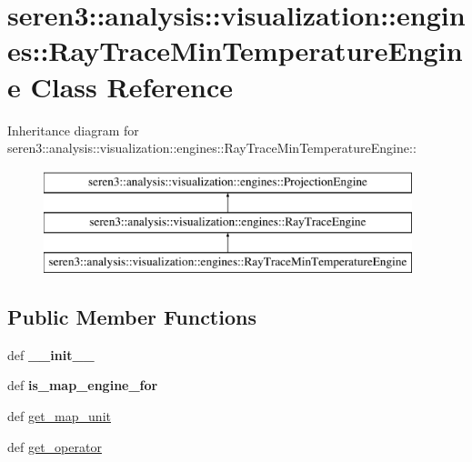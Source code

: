 \hypertarget{classseren3_1_1analysis_1_1visualization_1_1engines_1_1RayTraceMinTemperatureEngine}{
\section{seren3::analysis::visualization::engines::RayTraceMinTemperatureEngine Class Reference}
\label{classseren3_1_1analysis_1_1visualization_1_1engines_1_1RayTraceMinTemperatureEngine}
}
Inheritance diagram for seren3::analysis::visualization::engines::RayTraceMinTemperatureEngine::\begin{figure}[H]
\begin{center}
\leavevmode
\includegraphics[height=3cm]{classseren3_1_1analysis_1_1visualization_1_1engines_1_1RayTraceMinTemperatureEngine}
\end{center}
\end{figure}
\subsection*{Public Member Functions}
\begin{DoxyCompactItemize}
\item 
\hypertarget{classseren3_1_1analysis_1_1visualization_1_1engines_1_1RayTraceMinTemperatureEngine_ae3ad3045b6e11e034e7b1de487d62b72}{
def {\bfseries \_\-\_\-init\_\-\_\-}}
\label{classseren3_1_1analysis_1_1visualization_1_1engines_1_1RayTraceMinTemperatureEngine_ae3ad3045b6e11e034e7b1de487d62b72}

\item 
\hypertarget{classseren3_1_1analysis_1_1visualization_1_1engines_1_1RayTraceMinTemperatureEngine_a113275fa9fdb58977b93e260f0594454}{
def {\bfseries is\_\-map\_\-engine\_\-for}}
\label{classseren3_1_1analysis_1_1visualization_1_1engines_1_1RayTraceMinTemperatureEngine_a113275fa9fdb58977b93e260f0594454}

\item 
def \hyperlink{classseren3_1_1analysis_1_1visualization_1_1engines_1_1RayTraceMinTemperatureEngine_ae0cd2459819fa5df91728a1a74e91f45}{get\_\-map\_\-unit}
\item 
def \hyperlink{classseren3_1_1analysis_1_1visualization_1_1engines_1_1RayTraceMinTemperatureEngine_aec7ecf391ca54f86f96c840f62785a8e}{get\_\-operator}
\end{DoxyCompactItemize}


